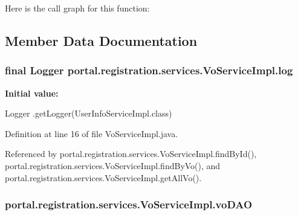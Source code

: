 Here is the call graph for this function:




\subsection{Member Data Documentation}
\hypertarget{classportal_1_1registration_1_1services_1_1VoServiceImpl_a9213c0db1eb0f44559f7e4c2ec13e0cf}{
\subsubsection[{log}]{\setlength{\rightskip}{0pt plus 5cm}final Logger {\bf portal.registration.services.VoServiceImpl.log}}}
\label{classportal_1_1registration_1_1services_1_1VoServiceImpl_a9213c0db1eb0f44559f7e4c2ec13e0cf}
{\bfseries Initial value:}
\begin{DoxyCode}
 Logger
                        .getLogger(UserInfoServiceImpl.class)
\end{DoxyCode}


Definition at line 16 of file VoServiceImpl.java.



Referenced by portal.registration.services.VoServiceImpl.findById(), portal.registration.services.VoServiceImpl.findByVo(), and portal.registration.services.VoServiceImpl.getAllVo().

\hypertarget{classportal_1_1registration_1_1services_1_1VoServiceImpl_a92aa539f17eb130f099f970cf9f408c1}{
\subsubsection[{voDAO}]{ {\bf portal.registration.services.VoServiceImpl.voDAO}}}
\label{classportal_1_1registration_1_1services_1_1VoServiceImpl_a92aa539f17eb130f099f970cf9f408c1}


